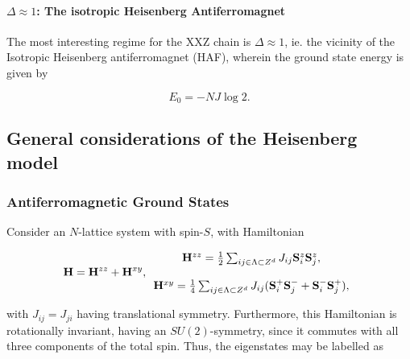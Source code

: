 \documentclass{homework}
\begin{document}
\clearpage

\paragraph{\textbf{$\Delta \approx 1$: The isotropic Heisenberg Antiferromagnet}}

The most interesting regime for the XXZ chain is $\Delta \approx 1$, ie. the vicinity of the Isotropic Heisenberg antiferromagnet (HAF), wherein the ground state energy is given by 

$$
    E_0 = - N J \log 2.
$$

\clearpage

\subsection{\textbf{General considerations of the Heisenberg model}}

\subsubsection{Antiferromagnetic Ground States}

Consider an $N$-lattice system with spin-$S$, with Hamiltonian

\begin{equation}
    {\bf H} = {\bf H}^{zz} + {\bf H}^{xy}, \begin{array}{c}
         {\bf H}^{zz} = \frac{1}{2} \sum_{ij \in \Lambda \subset Z^{d}} J_{ij} {\bf S}_i^z {\bf S}_j^z, \\  
         \\
         {\bf H}^{xy} = \frac{1}{4} \sum_{ij \in \Lambda \subset Z^{d}} J_{ij} ({\bf S}_i^+ {\bf S}_j^- + {\bf S}_i^- {\bf S}_j^+), \\  
    \end{array}
    \label{auerbach's HH hamiltonian}
\end{equation}

with $J_{ij} = J_{ji}$ having translational symmetry. Furthermore, this Hamiltonian is rotationally invariant, having an $SU(2)$-symmetry, since it commutes with all three components of the total spin. Thus, the eigenstates may be labelled as
\end{document}

